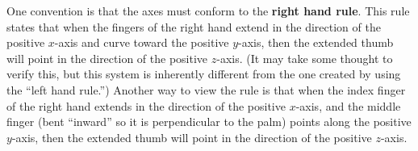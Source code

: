 
One convention is that the axes must conform to the \textbf{right hand rule}. This rule states that when the fingers of the right hand extend in the direction of the positive $x$-axis and curve toward the positive $y$-axis, then the extended thumb will point in the direction of the positive $z$-axis. (It may take some thought to verify this, but this system is inherently different from the one created by using the ``left hand rule.'')
Another way to view the rule is that when the index finger of the right hand extends in the direction of the positive $x$-axis, and the middle finger (bent ``inward'' so it is perpendicular to the palm) points along the positive $y$-axis, then the extended thumb will point in the direction of the positive $z$-axis.%

